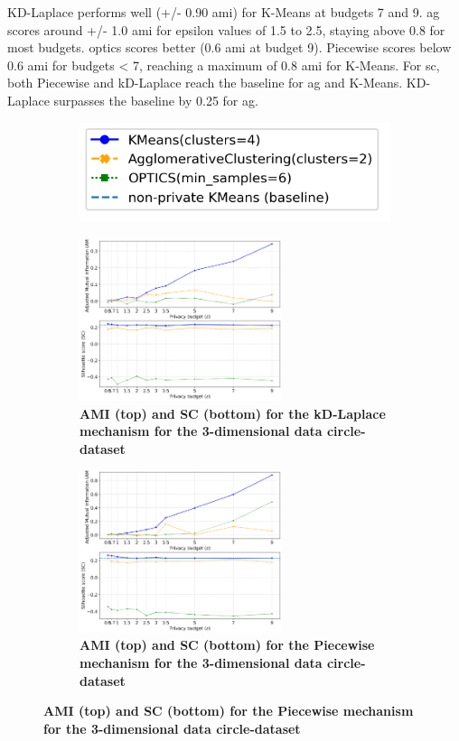 KD-Laplace performs well (+/- 0.90 \gls{ami}) for K-Means at budgets 7 and 9.
\gls{ag} scores around +/- 1.0 \gls{ami} for epsilon values of 1.5 to 2.5, staying above 0.8 for most budgets.
\gls{optics} scores better (0.6 \gls{ami} at budget 9).
Piecewise scores below 0.6 \gls{ami} for budgets < 7, reaching a maximum of 0.8 \gls{ami} for K-Means.
For \gls{sc}, both Piecewise and kD-Laplace reach the baseline for \gls{ag} and K-Means.
KD-Laplace surpasses the baseline by 0.25 for \gls{ag}.
\newpage
\begin{figure}[H]
  \centering
  \begin{subfigure}{0.3\textwidth}
    \includegraphics[width=\textwidth]{Results/kd-laplace/kd-Laplace/circle-dataset/legend_3.png}
  \end{subfigure}
  \begin{subfigure}{1\textwidth}
    \caption{\textbf{AMI (top) and SC (bottom) for the kD-Laplace mechanism for the 3-dimensional data circle-dataset}}
    \centering
    \includegraphics[width=0.65\textwidth]{Results/kd-laplace/kd-Laplace/circle-dataset/ami-and-sc_3_dimensions.png}
    \centering
  \end{subfigure}
  \begin{subfigure}{1\textwidth}
    \caption{\textbf{AMI (top) and SC (bottom) for the Piecewise mechanism for the 3-dimensional data circle-dataset}}
    \centering
    \includegraphics[width=0.65\textwidth]{Results/kd-laplace/piecewise/circle-dataset/ami-and-sc_3_dimensions.png}

\end{subfigure}
\end{figure}
